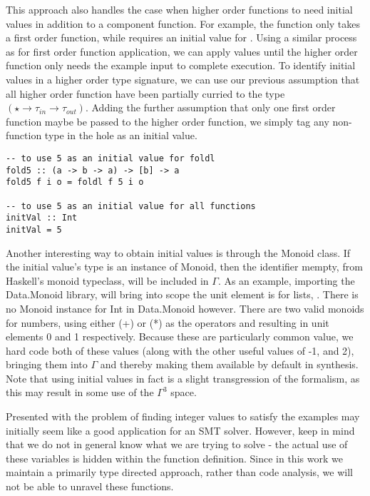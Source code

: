 This approach also handles the case when higher order functions to need initial values in addition to a component function.
For example, the  function only takes a first order function, while  requires an initial value for .
Using a similar process as for first order function application, we can apply values until the higher order function only needs the example input to complete execution.
To identify initial values in a higher order type signature, we can use our previous assumption that all higher order function have been partially curried to the type $(\star \to \tau_{in} \to \tau_{out})$. 
Adding the further assumption that only one first order function maybe be passed to the higher order function, we simply tag any non-function type in the hole as an initial value.

\begin{lstlisting}[caption=adding default initial values]
-- to use 5 as an initial value for foldl
fold5 :: (a -> b -> a) -> [b] -> a
fold5 f i o = foldl f 5 i o

-- to use 5 as an initial value for all functions
initVal :: Int
initVal = 5
\end{lstlisting}

Another interesting way to obtain initial values is through the Monoid class.
If the initial value's type is an instance of Monoid, then the identifier mempty, from Haskell's monoid typeclass\cite{monoid}, will be included in $\Gamma$.
As an example, importing the Data.Monoid library, will bring into scope the unit element is for lists, .
There is no Monoid instance for Int in Data.Monoid however. 
There are two valid monoids for numbers, using either (+) or (*) as the operators and resulting in unit elements 0 and 1 respectively. 
Because these are particularly common value,  we hard code both of these values (along with the other useful values of -1, and 2), bringing them into $\Gamma$ and thereby making them available by default in synthesis.
Note that using initial values in fact is a slight transgression of the formalism, as this may result in some use of the $\Gamma^3$ space.

Presented with the problem of finding integer values to satisfy the examples may initially seem like a good application for an SMT solver.
However, keep in mind that we do not in general know what we are trying to solve - the actual use of these variables is hidden within the function definition.
Since in this work we maintain a primarily type directed approach, rather than code analysis, we will not be able to unravel these functions.


